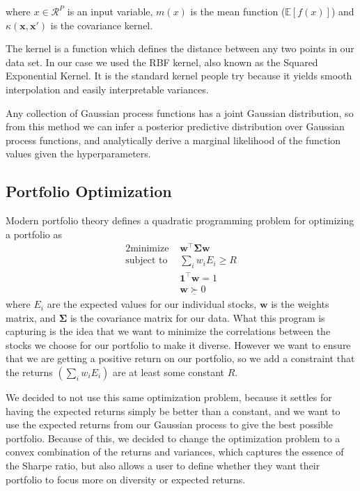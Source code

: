 \documentclass{article}
\begin{document}
where $x \in \mathcal{R}^P$ is an input variable, $m(x)$ is the mean function ($\mathbb{E}[f(x)]$) and $\kappa (\textbf{x}, \textbf{x}')$ is the covariance kernel.  

The kernel is a function which defines the distance between any two points in our data set. In our case we used the RBF kernel, also known as the Squared Exponential Kernel. It is the standard kernel people try because it yields smooth interpolation and easily interpretable variances. 

Any collection of Gaussian process functions has a joint Gaussian distribution, so from this method we can infer a posterior predictive distribution over Gaussian process functions, and analytically derive a marginal likelihood of the function values given the hyperparameters. \cite{spectral}


\subsection{Portfolio Optimization}

Modern portfolio theory defines a quadratic programming problem for optimizing a portfolio as
\begin{alignat*}{2}
    \text{minimize }   &   \textbf{w}^\top \mathbf{\Sigma} \textbf{w}\\
    \text{subject to } & \sum_i w_i E_i \geq R \\
    & \textbf{1}^\top \textbf{w} = 1 \\
    & \textbf{w} \underline{\succ} 0
\end{alignat*}
where $E_i$ are the expected values for our individual stocks, $\textbf{w}$ is the weights matrix, and $\mathbf{\Sigma}$ is the covariance matrix for our data. What this program is capturing is the idea that we want to minimize the correlations between the stocks we choose for our portfolio to make it diverse.  However we want to ensure that we are getting a positive return on our portfolio, so we add a constraint that the returns $\left(\sum_i w_i E_i \right)$ are at least some constant $R$.  

We decided to not use this same optimization problem, because it settles for having the expected returns simply be better than a constant, and we want to use the expected returns from our Gaussian process to give the best possible portfolio.  Because of this, we decided to change the optimization problem to a convex combination of the returns and variances, which captures the essence of the Sharpe ratio, but also allows a user to define whether they want their portfolio to focus more on diversity or expected returns.  
\end{document}
